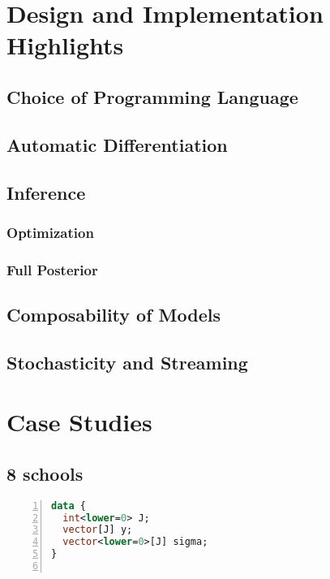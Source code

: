 \documentclass[sigplan,review,10pt,anonymous]{acmart}
\begin{document}
\begin{sloppypar}
\section{Design and Implementation Highlights}

\subsection{Choice of Programming Language}

\subsection{Automatic Differentiation}

\subsection{Inference}

\subsubsection{Optimization}

\subsubsection{Full Posterior}

\subsection{Composability of Models}

\subsection{Stochasticity and Streaming}

\section{Case Studies}
\label{sec:case-studies}

\subsection{8 schools}

\begin{figure*}
	\begin{minipage}{0.45\textwidth}
\begin{lstlisting}[language=Stan,numbers=left]
data {
  int<lower=0> J;
  vector[J] y;
  vector<lower=0>[J] sigma;
}


\end{lstlisting}
\end{minipage}
\end{figure*}
\end{sloppypar}
\end{document}
